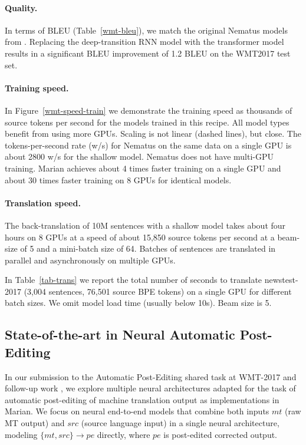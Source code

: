 \documentclass[11pt,a4paper]{article}
\begin{document}
\paragraph{Quality.} In terms of BLEU (Table~\ref{wmt-bleu}), we match  the original Nematus models from . 
Replacing the deep-transition RNN model with the transformer model results in a significant BLEU improvement of 1.2 BLEU on the WMT2017 test set. 

\paragraph{Training speed.}

In Figure~\ref{wmt-speed-train} we demonstrate the training speed as thousands of source tokens per second for the models trained in this recipe. All model types benefit from using more GPUs. Scaling is not linear (dashed lines), but close. The tokens-per-second rate (w/s) for Nematus on the same data on a single GPU is about 2800 w/s for the shallow model. Nematus does not have multi-GPU training. Marian achieves about 4 times faster training on a single GPU and about 30 times faster training on 8 GPUs for identical models.

\paragraph{Translation speed.}

The back-translation of 10M sentences with a shallow model takes about four hours on 8 GPUs at a speed of about 15,850 source tokens per second at a beam-size of 5 and a mini-batch size of 64. Batches of sentences are translated in parallel and asynchronously on multiple GPUs. 

In Table~\ref{tab-trans} we report the total number of seconds to translate newstest-2017 (3,004 sentences, 76,501 source BPE tokens) on a single GPU for different batch sizes. We omit model load time (usually below 10s). Beam size is 5.


\subsection{State-of-the-art in Neural Automatic Post-Editing}
In our submission to the Automatic Post-Editing shared task at WMT-2017 \cite{bojar-EtAl:2017:WMT1} and follow-up work \cite{junczysdowmunt-grundkiewicz:2017:WMT, I17-1013}, 
we explore multiple neural architectures adapted for the task of automatic post-editing of machine translation output as implementations in Marian. We focus on neural end-to-end models that combine both inputs $mt$ (raw MT output) and $src$ (source language input) in a single neural architecture, modeling $\{mt,src\}\rightarrow pe$ directly, where $pe$ is post-edited corrected output.
\end{document}

